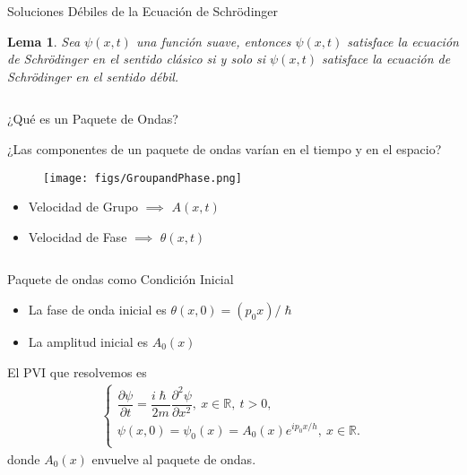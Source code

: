 \documentclass[aspectratio=1610]{beamer}
\newcommand*{\field}[1]{\mathbb{#1}}
\newtheorem*{lem}{Lema}
\begin{document}
\begin{frame}{Soluciones Débiles de la Ecuación de Schrödinger}
   
\begin{lem}
    Sea $\psi(x,t)$ una función suave, entonces $\psi(x,t)$ satisface la ecuación de Schrödinger en el sentido clásico si y solo si $\psi(x,t)$ satisface la ecuación de Schrödinger en el sentido débil.
\end{lem}   
    
\begin{columns}
\column{37em}
\end{columns}
\end{frame}


\begin{frame}{¿Qué es un Paquete de Ondas?}
   
¿Las componentes de un paquete de ondas varían en el tiempo y en el espacio?
\begin{figure}[h]
    \centering
    \texttt{[image: figs/GroupandPhase.png]}
\end{figure}
\begin{itemize}\itemsep1em
    \item \textcolor{}{Velocidad de Grupo $\implies$ $A(x,t)$}
    \item \textcolor{}{Velocidad de Fase $\implies$ $\theta(x,t)$}
\end{itemize}
    
\begin{columns}
\column{37em}
\end{columns}
\end{frame}

\begin{frame}{Paquete de ondas como Condición Inicial}
   
\begin{itemize}\itemsep1em
    \item \textcolor{}{La fase de onda inicial es $\theta(x,0) = (p_{0}x) / \hslash$}
    \item \textcolor{}{La amplitud inicial es $A_{0}(x)$}
\end{itemize} 

\vspace{0.1\textheight} 

El PVI que resolvemos es
\begin{align}
         \left\{ \begin{array}{ll}
         \dfrac{\partial\psi}{\partial t} = \dfrac{i\hslash}{2m}\dfrac{\partial^2\psi}{\partial x^2} , \:x\in\field{R}, \:t>0,\\
         \psi(x,0) = \psi_{0}(x) = A_{0}(x)e^{ip_{0}x/h}, \:x\in\field{R}. \\
         \end{array} \label{eq:Paqonda}
\right.
    \end{align}
donde $A_{0}(x)$ envuelve al paquete de ondas.
    
\begin{columns}
\column{37em}
\end{columns}
\end{frame}
\end{document}

